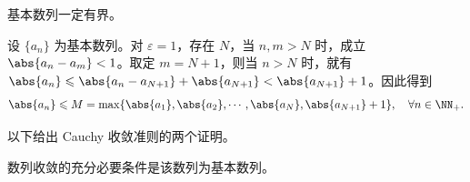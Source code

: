 \begin{xproposition}[3.4.2]
基本数列一定有界。
\end{xproposition}
\begin{xproof}
设 $\{a_n\}$ 为基本数列。对 $\varepsilon=1$，存在 $N$，当 $n,m>N$ 时，成立 $\abs{a_n-a_m}<1$。取定 $m=N+1$，则当 $n>N$ 时，就有 $\abs{a_n}\leqslant\abs{a_n-a_{N+1}}+\abs{a_{N+1}}<\abs{a_{N+1}}+1$。因此得到
\[
  \abs{a_n}\leqslant M=\max\{\abs{a_1},\abs{a_2},\cdots,\abs{a_N},\abs{a_{N+1}}+1\},\quad \forall n\in\NN_+.
\]
\end{xproof}

以下给出 Cauchy 收敛准则的两个证明。

\begin{xproposition}
数列收敛的充分必要条件是该数列为基本数列。
\end{xproposition}
